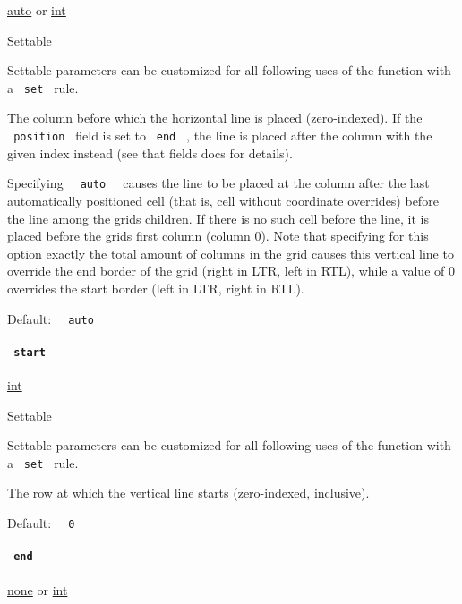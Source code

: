 \href{/docs/reference/foundations/auto/}{auto} {or}
\href{/docs/reference/foundations/int/}{int}

{{ Settable }}

\label{definitions-vline-x-settable-tooltip}
Settable parameters can be customized for all following uses of the
function with a \texttt{\ set\ } rule.

The column before which the horizontal line is placed (zero-indexed). If
the \texttt{\ position\ } field is set to \texttt{\ end\ } , the line is
placed after the column with the given index instead (see that
field\textquotesingle s docs for details).

Specifying \texttt{\ }{\texttt{\ auto\ }}\texttt{\ } causes the line to
be placed at the column after the last automatically positioned cell
(that is, cell without coordinate overrides) before the line among the
grid\textquotesingle s children. If there is no such cell before the
line, it is placed before the grid\textquotesingle s first column
(column 0). Note that specifying for this option exactly the total
amount of columns in the grid causes this vertical line to override the
end border of the grid (right in LTR, left in RTL), while a value of 0
overrides the start border (left in LTR, right in RTL).

Default: \texttt{\ }{\texttt{\ auto\ }}\texttt{\ }

\paragraph{\texorpdfstring{\texttt{\ start\ }}{ start }}\label{definitions-vline-start}

\href{/docs/reference/foundations/int/}{int}

{{ Settable }}

\label{definitions-vline-start-settable-tooltip}
Settable parameters can be customized for all following uses of the
function with a \texttt{\ set\ } rule.

The row at which the vertical line starts (zero-indexed, inclusive).

Default: \texttt{\ }{\texttt{\ 0\ }}\texttt{\ }

\paragraph{\texorpdfstring{\texttt{\ end\ }}{ end }}\label{definitions-vline-end}

\href{/docs/reference/foundations/none/}{none} {or}
\href{/docs/reference/foundations/int/}{int}

